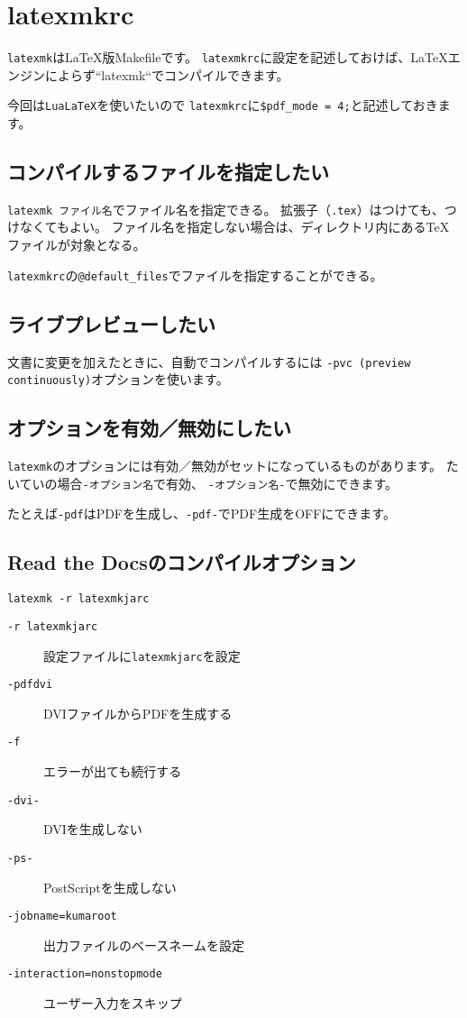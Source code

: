 \section{latexmkrc}

\texttt{latexmk}はLaTeX版Makefileです。
\texttt{latexmkrc}に設定を記述しておけば、LaTeXエンジンによらず``latexmk``でコンパイルできます。

今回は\texttt{LuaLaTeX}を使いたいので
\texttt{latexmkrc}に\texttt{\$pdf\_mode = 4;}と記述しておきます。

\subsection{コンパイルするファイルを指定したい}

\texttt{latexmk ファイル名}でファイル名を指定できる。
拡張子（\texttt{.tex}）はつけても、つけなくてもよい。
ファイル名を指定しない場合は、ディレクトリ内にあるTeXファイルが対象となる。

\texttt{latexmkrc}の\texttt{@default\_files}でファイルを指定することができる。

\subsection{ライブプレビューしたい}

文書に変更を加えたときに、自動でコンパイルするには
\texttt{-pvc (preview continuously)}オプションを使います。

\subsection{オプションを有効／無効にしたい}

\texttt{latexmk}のオプションには有効／無効がセットになっているものがあります。
たいていの場合\texttt{-オプション名}で有効、
\texttt{-オプション名-}で無効にできます。

たとえば\texttt{-pdf}はPDFを生成し、\texttt{-pdf-}でPDF生成をOFFにできます。

\subsection{Read the Docsのコンパイルオプション}

\begin{verbatim}
latexmk -r latexmkjarc
\end{verbatim}

\begin{description}
    \item[\texttt{-r latexmkjarc}] 設定ファイルに\texttt{latexmkjarc}を設定
    \item[\texttt{-pdfdvi}] DVIファイルからPDFを生成する
    \item[\texttt{-f}] エラーが出ても続行する
    \item[\texttt{-dvi-}] DVIを生成しない
    \item[\texttt{-ps-}] PostScriptを生成しない
    \item[\texttt{-jobname=kumaroot}] 出力ファイルのベースネームを設定
    \item[\texttt{-interaction=nonstopmode}] ユーザー入力をスキップ
\end{description}
